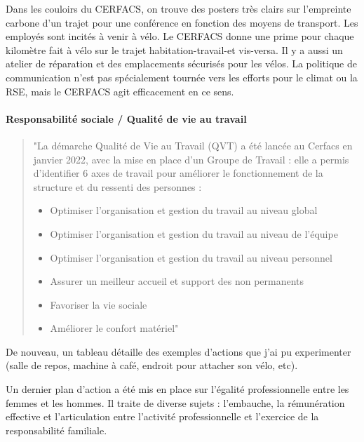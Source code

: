     Dans les couloirs du CERFACS, on trouve des posters très clairs sur l'empreinte carbone d'un trajet pour une conférence en fonction des moyens de transport.
    Les employés sont incités à venir à vélo. Le CERFACS donne une prime pour chaque kilomètre fait à vélo sur le trajet habitation-travail-et vis-versa. Il y a aussi un atelier de réparation et des emplacements sécurisés pour les vélos.
    La politique de communication n'est pas spécialement tournée vers les efforts pour le climat ou la RSE, mais le CERFACS agit efficacement en ce sens.

\paragraph{Responsabilité sociale / Qualité de vie au travail}
\hspace{0,5cm}

    \begin{quote}
        \setlength{\leftmargin}{0.5cm} %
        \setlength{\rightmargin}{0.5cm} %
        "La démarche Qualité de Vie au Travail (QVT) a été lancée au Cerfacs en janvier 2022, avec la mise en
        place d’un Groupe de Travail : elle a permis d’identifier 6 axes de travail pour améliorer le
        fonctionnement de la structure et du ressenti des personnes :
        \begin{itemize}
            \item Optimiser l’organisation et gestion du travail au niveau global
            \item Optimiser l’organisation et gestion du travail au niveau de l’équipe
            \item Optimiser l’organisation et gestion du travail au niveau personnel
            \item Assurer un meilleur accueil et support des non permanents
            \item Favoriser la vie sociale
            \item Améliorer le confort matériel"
        \end{itemize}
    \end{quote}

    De nouveau, un tableau  détaille des exemples d'actions que j'ai pu experimenter (salle de repos, machine à café, endroit pour attacher son vélo, etc).

    Un dernier plan d'action a été mis en place sur l'égalité professionnelle entre les femmes et les hommes. Il traite de diverse sujets : l’embauche, la rémunération effective et l’articulation entre l’activité professionnelle et l’exercice de la responsabilité familiale.

